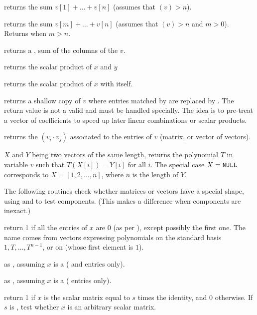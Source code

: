  returns the sum $v[1] + \dots + v[n]$
(assumes that $(v) > n$).

 returns the sum $v[m] + \dots +
v[n]$ (assumes that $(v) > n$ and $m > 0$). Returns 
when $m > n$.

 returns a , sum of the columns of the
 $v$.

 returns the scalar product of $x$ and $y$

 returns the scalar product of $x$ with itself.

 returns a shallow copy of $v$ where entries
matched by  are replaced by . The return value
is not a valid  and must be handled specially. The idea is
to pre-treat a vector of coefficients to speed up later linear combinations
or scalar products.

 returns the  $(v_i\cdot v_j)$
associated to the entries of $v$ (matrix, or vector of vectors).

 $X$ and $Y$ being two vectors of
the same length, returns the polynomial $T$ in variable $v$ such that
$T(X[i]) = Y[i]$ for all $i$. The special case $X = {\tt NULL}$
corresponds to $X = [1,2,\dots,n]$, where $n$ is the length of $Y$.


The following routines check whether matrices or vectors have a special
shape, using  and  to test components. (This makes
a difference when components are inexact.)

 return 1 if all the entries of $x$ are $0$
(as per ), except possibly the first one. The name comes from
vectors expressing polynomials on the standard basis $1,T,\dots, T^{n-1}$, or
on  (whose first element is $1$).

 as , assuming $x$ is a
 ( and  entries only).

 as , assuming $x$ is a
 ( entries only).

 return 1 if $x$ is the scalar matrix
equal to $s$ times the identity, and 0 otherwise. If $s$ is , test
whether $x$ is an arbitrary scalar matrix.


